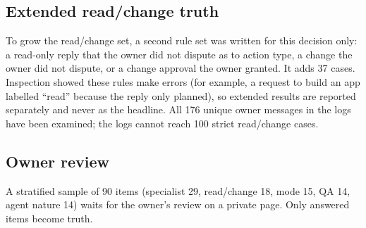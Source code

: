 \subsection{Extended read/change truth}
To grow the read/change set, a second rule set was written for this decision only: a read-only reply that the owner did not dispute as to action type, a change the owner did not dispute, or a change approval the owner granted. It adds 37 cases. Inspection showed these rules make errors (for example, a request to build an app labelled ``read'' because the reply only planned), so extended results are reported separately and never as the headline. All 176 unique owner messages in the logs have been examined; the logs cannot reach 100 strict read/change cases.
\subsection{Owner review}
A stratified sample of 90 items (specialist 29, read/change 18, mode 15, QA 14, agent nature 14) waits for the owner's review on a private page. Only answered items become truth. \prov{}
